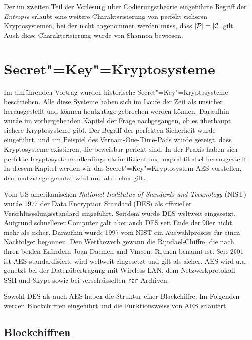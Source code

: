  
 \begin{remark}
  Der im zweiten Teil der Vorlesung über Codierungstheorie eingeführte Begriff der \emph{Entropie} erlaubt eine weitere Charakterisierung von perfekt sicheren Kryptosystemen, bei der nicht angenommen werden muss, dass $|\mathcal P| = |\mathcal C|$ gilt. Auch diese Charakterisierung wurde von Shannon bewiesen.
 \end{remark}

 
\chapter{Secret"=Key"=Kryptosysteme}

Im einführenden Vortrag wurden historische Secret"=Key"=Kryptosysteme beschrieben. Alle diese Systeme haben sich im Laufe der Zeit als unsicher herausgestellt und können heutzutage gebrochen werden können. Daraufhin wurde im vorhergehenden Kapitel der Frage nachgegangen, ob es überhaupt sichere Kryptosysteme gibt. Der Begriff der perfekten Sicherheit wurde eingeführt, und am Beispiel des Vernam-One-Time-Pads wurde gezeigt, dass Kryptosysteme existieren, die beweisbar perfekt sind. In der Praxis haben sich perfekte Kryptosysteme allerdings als ineffizient und unpraktikabel herausgestellt. In diesem Kapitel werden wir das Secret"=Key"=Kryptosystem AES vorstellen, das heutzutage genutzt wird und als sicher gilt.

Vom US-amerikanischen \emph{National Institutue of Standards and Technology} (NIST) wurde 1977 der Data Encryption Standard (DES) als offizieller Verschlüsselungsstandard eingeführt. Seitdem wurde DES weltweit eingesetzt. Aufgrund schnellerer Computer galt aber auch DES seit Ende der 90er nicht mehr als sicher. Daraufhin wurde 1997 vom NIST ein Auswahlprozess für einen Nachfolger begonnen. Den Wettbewerb gewann die Rijndael-Chiffre, die nach ihren beiden Erfindern Joan Daemen und Vincent Rijmen benannt ist. Seit 2001 ist AES standardisiert, wird weltweit eingesetzt und gilt als sicher. AES wird u.a. genutzt bei der Datenübertragung mit Wireless LAN, dem Netzwerkprotokoll SSH und Skype sowie bei verschlüsselten \texttt{rar}-Archiven.

Sowohl DES als auch AES haben die Struktur einer Blockchiffre. Im Folgenden werden Blockchiffren eingeführt und die Funktionsweise von AES erläutert.

\section{Blockchiffren}

